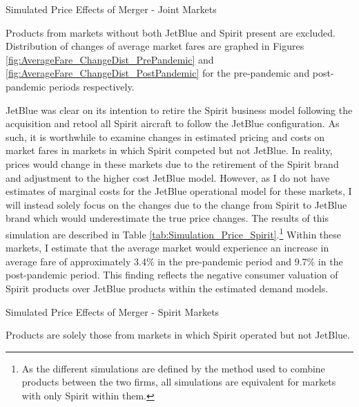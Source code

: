 \documentclass{article}
\begin{document}
    \begin{table}
        \caption{Simulated Price Effects of Merger - Joint Markets}
        \label{tab:Simulation_Price}
                \vspace{-15mm}
        \begin{center}
         
        \end{center}
        \vspace{-5mm}
        \footnotesize{Products from markets without both JetBlue and Spirit present are excluded. Distribution of changes of average market fares are graphed in Figures \ref{fig:AverageFare_ChangeDist_PrePandemic} and \ref{fig:AverageFare_ChangeDist_PostPandemic} for the pre-pandemic and post-pandemic periods respectively.}

     \end{table}

     JetBlue was clear on its intention to retire the Spirit business model following the acquisition and retool all Spirit aircraft to follow the JetBlue configuration. As such, it is worthwhile to examine changes in estimated pricing and costs on market fares in markets in which Spirit competed but not JetBlue. In reality, prices would change in these markets due to the retirement of the Spirit brand and adjustment to the higher cost JetBlue model. However, as I do not have estimates of marginal costs for the JetBlue operational model for these markets, I will instead solely focus on the changes due to the change from Spirit to JetBlue brand which would underestimate the true price changes. The results of this simulation are described in Table \ref{tab:Simulation_Price_Spirit}.\footnote{As the different simulations are defined by the method used to combine products between the two firms, all simulations are equivalent for markets with only Spirit within them.} Within these markets, I estimate that the average market would experience an increase in average fare of approximately 3.4\% in the pre-pandemic period and 9.7\% in the post-pandemic period. This finding reflects the negative consumer valuation of Spirit products over JetBlue products within the estimated demand models.

    \begin{table}
        \caption{Simulated Price Effects of Merger - Spirit Markets}
        \label{tab:Simulation_Price_Spirit}
                        \vspace{-15mm}
        \begin{center}
              
        \end{center}
        \vspace{-5mm}
        \footnotesize{Products are solely those from markets in which Spirit operated but not JetBlue.}
    \end{table}
\end{document}
